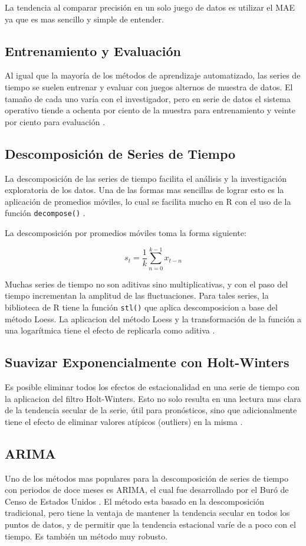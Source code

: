 La tendencia al comparar precisión en un solo juego de datos es utilizar el MAE ya que es mas sencillo y simple de entender. 

\subsection*{Entrenamiento y Evaluación}
Al igual que la mayoría de los métodos de aprendizaje automatizado, las series de tiempo se suelen entrenar y evaluar con juegos alternos de muestra de datos. El tamaño de cada uno varía con el investigador, pero en serie de datos el sistema operativo tiende a ochenta por ciento de la muestra para entrenamiento y veinte por ciento para evaluación \cite{hyndman}.

\subsection*{Descomposición de Series de Tiempo}
La descomposición de las series de tiempo facilita el análisis y la investigación exploratoria de los datos. Una de las formas mas sencillas de lograr esto es la aplicación de promedios móviles, lo cual se facilita mucho en R con el uso de la función \texttt{decompose()} \cite{daroczi}.

La descomposición por promedios móviles toma la forma siguiente:

\[ s_{t} = \frac{1}{k} \sum_{n = 0}^{k - 1} x_{t - n}  \]

Muchas series de tiempo no son aditivas sino multiplicativas, y con el paso del tiempo incrementan la amplitud de las fluctuaciones. Para tales series, la biblioteca de R tiene la función \texttt{stl()} que aplica descomposicion a base del método Loess. La aplicacion del método Loess y la transformación de la función a una logarítmica tiene el efecto de replicarla como aditiva \cite{viswanathan}.

\subsection*{Suavizar Exponencialmente con Holt-Winters}
Es posible eliminar todos los efectos de estacionalidad en una serie de tiempo con la aplicacion del filtro Holt-Winters. Esto no solo resulta en una lectura mas clara de la tendencia secular de la serie, útil para pronósticos, sino que adicionalmente tiene el efecto de eliminar valores atípicos (outliers) en la misma \cite{daroczi}.

\subsection*{ARIMA}
Uno de los métodos mas populares para la descomposición de series de tiempo con periodos de doce meses es ARIMA, el cual fue desarrollado por el Buró de Censo de Estados Unidos \cite{hyndman}. El método esta basado en la descomposición tradicional, pero tiene la ventaja de mantener la tendencia secular en todos los puntos de datos, y de permitir que la tendencia estacional varíe de a poco con el tiempo. Es también un método muy robusto.

